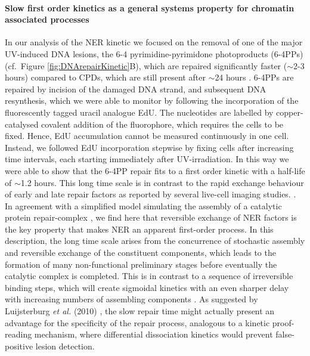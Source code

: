 \paragraph{Slow first order kinetics as a general systems property for chromatin associated processes}
In our analysis of the NER kinetic we focused on the removal of one of the major UV-induced DNA lesions, the 6-4 pyrimidine-pyrimidone photoproducts (6-4PPs) (cf.\ Figure \ref{fig:DNArepairKinetic}B), which are repaired significantly faster ($\sim$2-3 hours) compared to CPDs, which are still present after $\sim$24 hours \cite{Smerdon1978,vanHoffen:1995:EMBO-J:7835346,Luijsterburg2010}. 6-4PPs are repaired by incision of the damaged DNA strand, and subsequent DNA resynthesis, which we were able to monitor by following the incorporation of the fluorescently tagged uracil analogue EdU. The nucleotides are labelled by copper-catalysed covalent addition of the fluorophore, which requires the cells to be fixed. Hence, EdU accumulation cannot be measured continuously in one cell. Instead, we followed EdU incorporation stepwise by fixing cells after increasing time intervals, each starting immediately after UV-irradiation. In this way we were able to show that the 6-4PP repair fits to a first order kinetic with a half-life of $\sim$1.2 hours.         
This long time scale is in contrast to the rapid exchange behaviour of early and late repair factors as reported by several live-cell imaging studies. \cite{Houtsmuller1999,Volker2001,Hoogstraten2002,Rademakers2003,Mone2004,Zotter2006,Hoogstraten2008,Luijsterburg2010}. \\
In agreement with a simplified model simulating the assembly of a catalytic protein repair-complex \cite{Terstiege2010}, we find here that reversible exchange of NER factors is the key property that makes NER an apparent first-order process. In this description, the long time scale arises from the concurrence of stochastic assembly and reversible exchange of the constituent components, which leads to the formation of many non-functional preliminary stages before eventually the catalytic complex is completed. This is in contrast to a sequence of irreversible binding steps, which will create sigmoidal kinetics with an even sharper delay with increasing numbers of assembling components \cite{Terstiege2010}. As suggested by Luijsterburg \textit{et al.} (2010) \cite{Luijsterburg2010}, the slow repair time might actually present an advantage for the specificity of the repair process, analogous to a kinetic proof-reading mechanism, where differential dissociation kinetics would prevent false-positive lesion detection. \\ 
